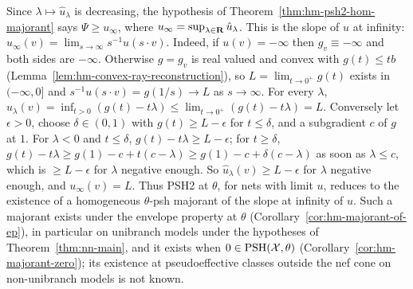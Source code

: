 \begin{remark}\label{rmk:hm-majorant-hypothesis}
\notready
{}
Since $\lambda\mapsto\hat u_\lambda$ is decreasing, the hypothesis of Theorem~\ref{thm:hm-psh2-hom-majorant} says $\Psi\ge u_\infty$, where
$u_\infty=\sup_{\lambda\in\mathbf{R}}\hat u_\lambda$. This is the slope of $u$ at infinity: $u_\infty(v)=\lim_{s\to\infty}s^{-1}u(s\cdot v)$. Indeed, if $u(v)=-\infty$ then
$g_v\equiv-\infty$ and both sides are $-\infty$. Otherwise $g=g_v$ is real valued and convex with $g(t)\le tb$ (Lemma~\ref{lem:hm-convex-ray-reconstruction}), so
$L=\lim_{t\to0^+}g(t)$ exists in $(-\infty,0]$ and $s^{-1}u(s\cdot v)=g(1/s)\to L$ as $s\to\infty$. For every $\lambda$,
$\hat u_\lambda(v)=\inf_{t>0}(g(t)-t\lambda)\le\lim_{t\to0^+}(g(t)-t\lambda)=L$. Conversely let $\epsilon>0$, choose $\delta\in(0,1)$ with $g(t)\ge L-\epsilon$ for
$t\le\delta$, and a subgradient $c$ of $g$ at $1$. For $\lambda<0$ and $t\le\delta$, $g(t)-t\lambda\ge L-\epsilon$; for $t\ge\delta$,
$g(t)-t\lambda\ge g(1)-c+t(c-\lambda)\ge g(1)-c+\delta(c-\lambda)$ as soon as $\lambda\le c$, which is $\ge L-\epsilon$ for $\lambda$ negative enough. So
$\hat u_\lambda(v)\ge L-\epsilon$ for $\lambda$ negative enough, and $u_\infty(v)=L$. Thus PSH2 at $\theta$, for nets with limit $u$, reduces to the existence of a
homogeneous $\theta$-psh majorant of the slope at infinity of $u$. Such a majorant exists under the envelope property at $\theta$
(Corollary~\ref{cor:hm-majorant-of-ep}), in particular on unibranch models under the hypotheses of Theorem~\ref{thm:nn-main}, and it exists when $0\in\operatorname{PSH}(\mathcal X,\theta)$
(Corollary~\ref{cor:hm-majorant-zero}); its existence at pseudoeffective classes outside the nef cone on non-unibranch models is not known.
\end{remark}
